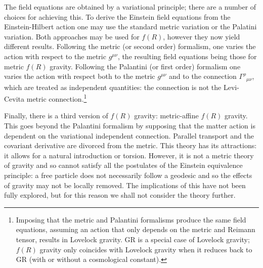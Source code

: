 \documentclass[a4paper, 11pt, titlepage, twoside]{report}
\begin{document}
The field equations are obtained by a variational principle; there are a number of choices for achieving this. To derive the Einstein field equations from the Einstein-Hilbert action one may use the standard metric variation or the Palatini variation\cite{Misner1973}. Both approaches may be used for $f(R)$, however they now yield different results\cite{Sotiriou2010, DeFelice2010}. Following the metric (or second order) formalism, one varies the action with respect to the metric $g^{\mu\nu}$, the resulting field equations being those for metric $f(R)$ gravity. Following the Palantini (or first order) formalism one varies the action with respect both to the metric $g^{\mu\nu}$ and to the connection ${\Gamma^\rho}_{\mu\nu}$, which are treated as independent quantities: the connection is not the Levi-Cevita metric connection.\footnote{Imposing that the metric and Palantini formalisms produce the same field equations, assuming an action that only depends on the metric and Reimann tensor, results in Lovelock gravity\cite{Exirifard2008}. GR is a special case of Lovelock gravity; $f(R)$ gravity only coincides with Lovelock gravity when it reduces back to GR (with or without a cosmological constant).}

Finally, there is a third version of $f(R)$ gravity: metric-affine $f(R)$ gravity\cite{Sotiriou2007, Sotiriou2007b}. This goes beyond the Palantini formalism by supposing that the matter action is dependent on the variational independent connection. Parallel transport and the covariant derivative are divorced from the metric. This theory has its attractions: it allows for a natural introduction or torsion. However, it is not a metric theory of gravity and so cannot satisfy all the postulates of the Einstein equivalence principle\cite{Will2006}: a free particle does not necessarily follow a geodesic and so the effects of gravity may not be locally removed\cite{Exirifard2008}. The implications of this have not been fully explored, but for this reason we shall not consider the theory further.
\end{document}
